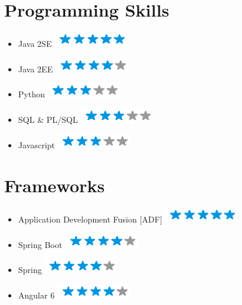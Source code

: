 \documentclass[]{friggeri-cv}
\begin{document}
\section{Programming Skills}
\begin{itemize}
    \item {Java 2SE} {\hfill \includegraphics[scale=0.40]{img/5stars.png}} 

	\item {Java 2EE} {\hfill \includegraphics[scale=0.40]{img/4stars.png}}             
            
    \item {Python} {\hfill \includegraphics[scale=0.40]{img/3stars.png}} 
   
    \item {SQL \& PL/SQL} {\hfill \includegraphics[scale=0.40]{img/3stars.png}} 
    
    \item {Javascript} {\hfill \includegraphics[scale=0.40]{img/3stars.png}} 
       
\end{itemize}

\section{Frameworks}
\begin{itemize}
    \item {Application Development Fusion [ADF]}  \hfill \includegraphics[scale=0.40]{img/5stars.png}
    
    \item {Spring Boot} \hfill \includegraphics[scale=0.40]{img/4stars.png} 
    
    \item {Spring} \hfill \includegraphics[scale=0.40]{img/4stars.png} 
            
    \item {Angular 6} \hfill \includegraphics[scale=0.40]{img/4stars.png}     
\end{itemize}
  
\end{document}
